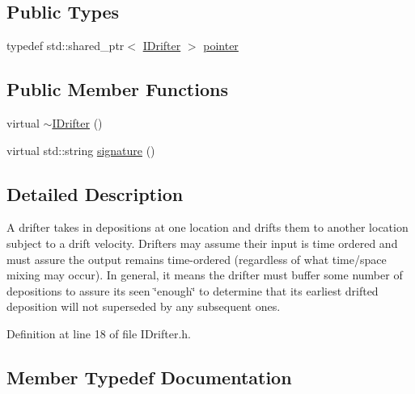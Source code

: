 \subsection*{Public Types}
\begin{DoxyCompactItemize}
\item 
typedef std\+::shared\+\_\+ptr$<$ \hyperlink{class_wire_cell_1_1_i_drifter}{I\+Drifter} $>$ \hyperlink{class_wire_cell_1_1_i_drifter_a2ba4a7cb70359edbc455f7fa711e58d6}{pointer}
\end{DoxyCompactItemize}
\subsection*{Public Member Functions}
\begin{DoxyCompactItemize}
\item 
virtual \hyperlink{class_wire_cell_1_1_i_drifter_a3f1d99bfce8eb3b203617690dcae04d8}{$\sim$\+I\+Drifter} ()
\item 
virtual std\+::string \hyperlink{class_wire_cell_1_1_i_drifter_af7f5abc751d9bd227d5bed94aa416a13}{signature} ()
\end{DoxyCompactItemize}


\subsection{Detailed Description}
A drifter takes in depositions at one location and drifts them to another location subject to a drift velocity. Drifters may assume their input is time ordered and must assure the output remains time-\/ordered (regardless of what time/space mixing may occur). In general, it means the drifter must buffer some number of depositions to assure it\textquotesingle{}s seen \char`\"{}enough\char`\"{} to determine that its earliest drifted deposition will not superseded by any subsequent ones. 

Definition at line 18 of file I\+Drifter.\+h.



\subsection{Member Typedef Documentation}
\mbox{\label{class_wire_cell_1_1_i_drifter_a2ba4a7cb70359edbc455f7fa711e58d6}} 
